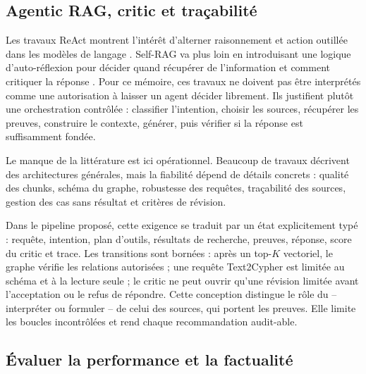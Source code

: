 \subsection{Agentic RAG, critic et traçabilité}
Les travaux ReAct montrent l'intérêt d'alterner raisonnement et action outillée dans les modèles de langage \cite{yao2023react}. Self-RAG va plus loin en introduisant une logique d'auto-réflexion pour décider quand récupérer de l'information et comment critiquer la réponse \cite{asai2024selfrag}. Pour ce mémoire, ces travaux ne doivent pas être interprétés comme une autorisation à laisser un agent décider librement. Ils justifient plutôt une orchestration contrôlée : classifier l'intention, choisir les sources, récupérer les preuves, construire le contexte, générer, puis vérifier si la réponse est suffisamment fondée.

Le manque de la littérature est ici opérationnel. Beaucoup de travaux décrivent des architectures générales, mais la fiabilité dépend de détails concrets : qualité des chunks, schéma du graphe, robustesse des requêtes, traçabilité des sources, gestion des cas sans résultat et critères de révision. %

Dans le pipeline proposé, cette exigence se traduit par un état explicitement typé : requête, intention, plan d'outils, résultats de recherche, preuves, réponse, score du critic et trace. Les transitions sont bornées : après un top-$K$ vectoriel, le graphe vérifie les relations autorisées ; une requête Text2Cypher est limitée au schéma et à la lecture seule ; le critic ne peut ouvrir qu'une révision limitée avant l'acceptation ou le refus de répondre. Cette conception distingue le rôle du \LLM{} -- interpréter ou formuler -- de celui des sources, qui portent les preuves. Elle limite les boucles incontrôlées et rend chaque recommandation audit-able.

\subsection{Évaluer la performance et la factualité}

